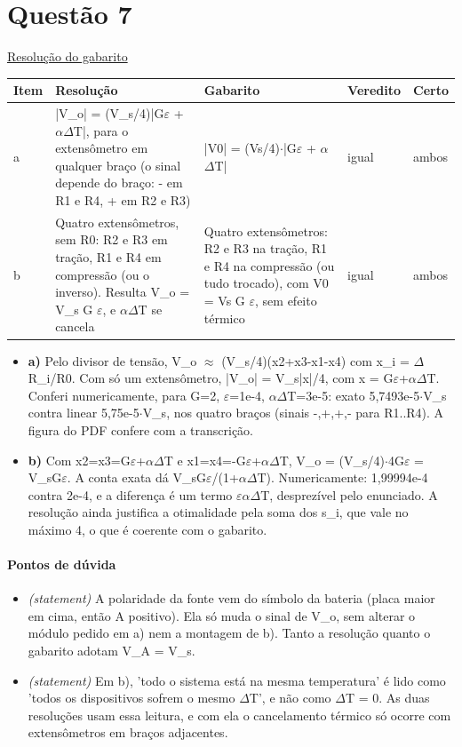 \documentclass{article}%
\begin{document}
\section*{Questão 7}%
\href{https://poliedroresolve.sistemapoliedro.com.br/vestibulares/ita/2027/ita-2-fase-dia-3-22-10-2026-2-fase-dia-3/dissertativa-7-fisica-2-fase-dia-3-ita-2027}{Resolução do gabarito}\par\smallskip%
\begin{longtable}{@{}p{} p{} p{} p{} p{}@{}}\toprule Item & Resolução & Gabarito & Veredito & Certo \\ \midrule
a & |V\_o| = (V\_s/4)|G$\varepsilon$ + $\alpha$$\Delta$T|, para o extensômetro em qualquer braço (o sinal depende do braço: - em R1 e R4, + em R2 e R3) & |V0| = (Vs/4)$\cdot$|G$\varepsilon$ + $\alpha$$\Delta$T| & igual & ambos \\
b & Quatro extensômetros, sem R0: R2 e R3 em tração, R1 e R4 em compressão (ou o inverso). Resulta V\_o = V\_s G $\varepsilon$, e $\alpha$$\Delta$T se cancela & Quatro extensômetros: R2 e R3 na tração, R1 e R4 na compressão (ou tudo trocado), com V0 = Vs G $\varepsilon$, sem efeito térmico & igual & ambos \\
\bottomrule\end{longtable}%
\begin{itemize}%
\item%
\textbf{a)} Pelo divisor de tensão, V\_o $\approx$ (V\_s/4)(x2+x3-x1-x4) com x\_i = $\Delta$R\_i/R0. Com só um extensômetro, |V\_o| = V\_s|x|/4, com x = G$\varepsilon$+$\alpha$$\Delta$T. Conferi numericamente, para G=2, $\varepsilon$=1e{-}4, $\alpha$$\Delta$T=3e{-}5: exato 5,7493e{-}5$\cdot$V\_s contra linear 5,75e{-}5$\cdot$V\_s, nos quatro braços (sinais -,+,+,- para R1..R4). A figura do PDF confere com a transcrição.%
\item%
\textbf{b)} Com x2=x3=G$\varepsilon$+$\alpha$$\Delta$T e x1=x4=-G$\varepsilon$+$\alpha$$\Delta$T, V\_o = (V\_s/4)$\cdot$4G$\varepsilon$ = V\_sG$\varepsilon$. A conta exata dá V\_sG$\varepsilon$/(1+$\alpha$$\Delta$T). Numericamente: 1,99994e{-}4 contra 2e{-}4, e a diferença é um termo $\varepsilon$$\alpha$$\Delta$T, desprezível pelo enunciado. A resolução ainda justifica a otimalidade pela soma dos s\_i, que vale no máximo 4, o que é coerente com o gabarito.%
\end{itemize}%
\paragraph{Pontos de dúvida}%
\begin{itemize}%
\item%
\textit{(statement)} A polaridade da fonte vem do símbolo da bateria (placa maior em cima, então A positivo). Ela só muda o sinal de V\_o, sem alterar o módulo pedido em a) nem a montagem de b). Tanto a resolução quanto o gabarito adotam V\_A = V\_s.%
\item%
\textit{(statement)} Em b), 'todo o sistema está na mesma temperatura' é lido como 'todos os dispositivos sofrem o mesmo $\Delta$T', e não como $\Delta$T = 0. As duas resoluções usam essa leitura, e com ela o cancelamento térmico só ocorre com extensômetros em braços adjacentes.%
\end{itemize}%
\end{document}
